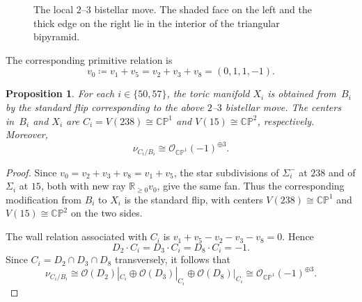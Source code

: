 \documentclass{amsart}
\newtheorem{proposition}[theorem]{Proposition}
\numberwithin{equation}{section}
\theoremstyle{definition}
\newcommand{\R}{\mathbb R}
\newcommand{\cO}{\mathcal O}
\newcommand{\CP}{\mathbb{CP}}
\begin{document}
\begin{figure}[t]
    \caption{The local $2$--$3$ bistellar move. The shaded face on the left and the thick edge on the right lie in the interior of the triangular bipyramid.}
    \label{fig:bistellar}
\end{figure}
The corresponding primitive relation is
$$
    v_0 \coloneq v_1+v_5=v_2+v_3+v_8=(0,1,1,-1).
$$

\begin{proposition}\label{prop:common-flip}
    For each $i\in\{50,57\}$, the toric manifold $X_i$ is obtained from~$B_i$ by the standard flip corresponding to the above $2$--$3$ bistellar move.
    The centers in~$B_i$ and $X_i$ are $C_i=V(238)\cong\CP^1$ and $V(15)\cong\CP^2$, respectively.
    Moreover,
    $$
        \nu_{C_i/B_i}\cong\cO_{\CP^1}(-1)^{\oplus3}.
    $$
\end{proposition}
\begin{proof}
    Since $v_0=v_2+v_3+v_8=v_1+v_5$, the star subdivisions of $\Sigma_i^-$ at $238$ and of $\Sigma_i$ at $15$, both with new ray $\R_{\geq0}v_0$, give the same fan.
    Thus the corresponding modification from $B_i$ to $X_i$ is the standard flip, with centers $V(238)\cong\CP^1$ and $V(15)\cong\CP^2$ on the two sides.

    The wall relation associated with $C_i$ is $v_1+v_5-v_2-v_3-v_8=0$.
    Hence
    $$
        D_2\cdot C_i=D_3\cdot C_i=D_8\cdot C_i=-1.
    $$
    Since $C_i=D_2\cap D_3\cap D_8$ transversely, it follows that
    $$
        \nu_{C_i/B_i} \cong \cO(D_2)|_{C_i}\oplus \cO(D_3)|_{C_i}\oplus \cO(D_8)|_{C_i} \cong \cO_{\CP^1}(-1)^{\oplus3}.
    $$
\end{proof}
\end{document}
